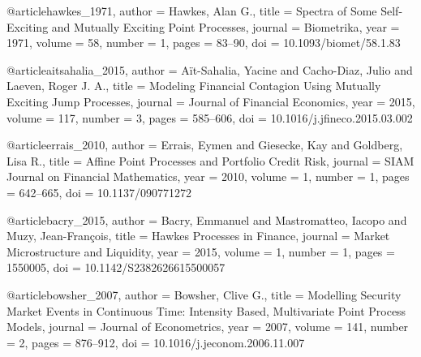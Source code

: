 

@article{hawkes_1971,
  author  = {Hawkes, Alan G.},
  title   = {Spectra of Some Self-Exciting and Mutually Exciting Point Processes},
  journal = {Biometrika}, year = {1971}, volume = {58}, number = {1}, pages = {83--90},
  doi     = {10.1093/biomet/58.1.83}
}


@article{aitsahalia_2015,
  author  = {A{\"i}t-Sahalia, Yacine and Cacho-Diaz, Julio and Laeven, Roger J. A.},
  title   = {Modeling Financial Contagion Using Mutually Exciting Jump Processes},
  journal = {Journal of Financial Economics},
  year    = {2015}, volume = {117}, number = {3}, pages = {585--606},
  doi     = {10.1016/j.jfineco.2015.03.002}
}


@article{errais_2010,
  author  = {Errais, Eymen and Giesecke, Kay and Goldberg, Lisa R.},
  title   = {Affine Point Processes and Portfolio Credit Risk},
  journal = {SIAM Journal on Financial Mathematics},
  year    = {2010}, volume = {1}, number = {1}, pages = {642--665},
  doi     = {10.1137/090771272}
}


@article{bacry_2015,
  author  = {Bacry, Emmanuel and Mastromatteo, Iacopo and Muzy, Jean-Fran{\c{c}}ois},
  title   = {Hawkes Processes in Finance},
  journal = {Market Microstructure and Liquidity},
  year    = {2015}, volume = {1}, number = {1}, pages = {1550005},
  doi     = {10.1142/S2382626615500057}
}


@article{bowsher_2007,
  author  = {Bowsher, Clive G.},
  title   = {Modelling Security Market Events in Continuous Time: Intensity Based, Multivariate Point Process Models},
  journal = {Journal of Econometrics},
  year    = {2007}, volume = {141}, number = {2}, pages = {876--912},
  doi     = {10.1016/j.jeconom.2006.11.007}
}


